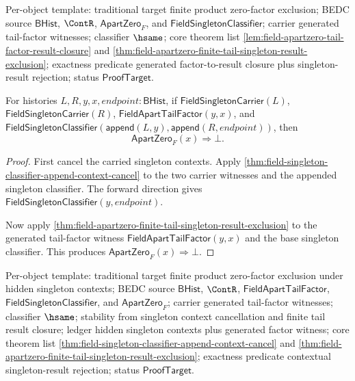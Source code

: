 Per-object template: traditional target finite product zero-factor exclusion;
BEDC source $\mathsf{BHist}$, $\ContR$, $\mathsf{ApartZero}_F$, and
$\mathsf{FieldSingletonClassifier}$; carrier generated tail-factor witnesses;
classifier $\hsame$; core theorem list
\autoref{lem:field-apartzero-tail-factor-result-closure} and
\autoref{thm:field-apartzero-finite-tail-singleton-result-exclusion};
exactness predicate generated factor-to-result closure plus singleton-result
rejection; status $\mathsf{ProofTarget}$.

\begin{theorem}
\label{thm:field-apartzero-finite-tail-contextual-singleton-result-exclusion}
For histories $L,R,y,x,endpoint:\mathsf{BHist}$, if
$\mathsf{FieldSingletonCarrier}(L)$, $\mathsf{FieldSingletonCarrier}(R)$,
$\mathsf{FieldApartTailFactor}(y,x)$, and
$\mathsf{FieldSingletonClassifier}(\mathsf{append}(L,y),\mathsf{append}(R,endpoint))$,
then
$$
\mathsf{ApartZero}_F(x)\Rightarrow\bot.
$$
\end{theorem}
\begin{proof}
First cancel the carried singleton contexts. Apply
\autoref{thm:field-singleton-classifier-append-context-cancel} to the two
carrier witnesses and the appended singleton classifier. The forward direction
gives $\mathsf{FieldSingletonClassifier}(y,endpoint)$.

Now apply
\autoref{thm:field-apartzero-finite-tail-singleton-result-exclusion} to the
generated tail-factor witness
$\mathsf{FieldApartTailFactor}(y,x)$ and the base singleton classifier. This
produces $\mathsf{ApartZero}_F(x)\Rightarrow\bot$.
\end{proof}

Per-object template: traditional target finite product zero-factor exclusion
under hidden singleton contexts; BEDC source $\mathsf{BHist}$, $\ContR$,
$\mathsf{FieldApartTailFactor}$, $\mathsf{FieldSingletonClassifier}$, and
$\mathsf{ApartZero}_F$; carrier generated tail-factor witnesses; classifier
$\hsame$; stability from singleton context cancellation and finite tail result
closure; ledger hidden singleton contexts plus generated factor witness; core
theorem list \autoref{thm:field-singleton-classifier-append-context-cancel} and
\autoref{thm:field-apartzero-finite-tail-singleton-result-exclusion};
exactness predicate contextual singleton-result rejection; status
$\mathsf{ProofTarget}$.


